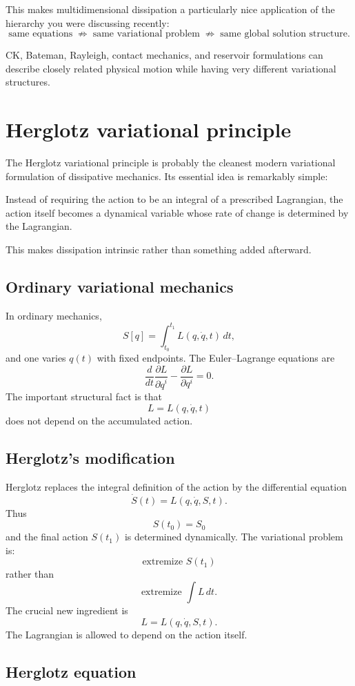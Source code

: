 This makes multidimensional dissipation a particularly nice application of the hierarchy you were discussing recently:
$$ \boxed{ \text{same equations} \;\not\Rightarrow\; \text{same variational problem} \;\not\Rightarrow\; \text{same global solution structure}. } $$

CK, Bateman, Rayleigh, contact mechanics, and reservoir formulations can describe closely related physical motion while having very different variational structures.

\section{Herglotz variational principle}
The Herglotz variational principle is probably the cleanest modern variational formulation of dissipative mechanics. Its essential idea is remarkably simple:

Instead of requiring the action to be an integral of a prescribed Lagrangian, the action itself becomes a dynamical variable whose rate of change is determined by the Lagrangian.

This makes dissipation intrinsic rather than something added afterward.

\subsection{Ordinary variational mechanics}

In ordinary mechanics,
$$ S[q]=\int_{t_0}^{t_1}L(q,\dot q,t)\,dt, $$
and one varies \(q(t)\) with fixed endpoints.
The Euler–Lagrange equations are
$$ \frac{d}{dt}\frac{\partial L}{\partial\dot q^i} - \frac{\partial L}{\partial q^i}=0. $$
The important structural fact is that $$ L=L(q,\dot q,t) $$
does not depend on the accumulated action.

\subsection{Herglotz's modification}

Herglotz replaces the integral definition of the action by the differential equation $$ \boxed{ \dot S(t)=L(q,\dot q,S,t). } $$
Thus $$ S(t_0)=S_0 $$ and the final action \(S(t_1)\) is determined dynamically.
The variational problem is:
$$ \boxed{\text{extremize }S(t_1)} $$
rather than
$$ \text{extremize }\int L\,dt. $$
The crucial new ingredient is
$$ \boxed{L=L(q,\dot q,S,t).} $$
The Lagrangian is allowed to depend on the action itself.

\subsection{Herglotz equation}

